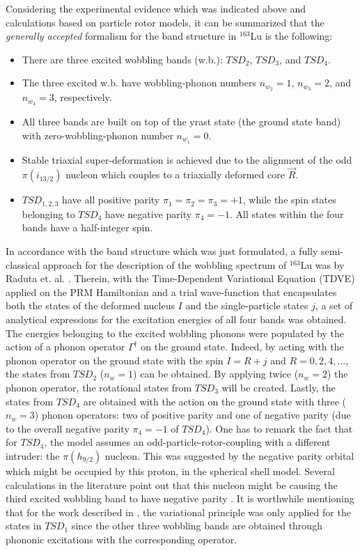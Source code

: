 \documentclass[11pt]{article}
\begin{document}
Considering the experimental evidence which was indicated above and calculations based on particle rotor models, it can be summarized that the \emph{generally accepted} formalism for the band structure in $^{163}$Lu is the following:
\begin{itemize}
    \item There are three excited wobbling bands (w.b.): $TSD_2$, $TSD_3$, and $TSD_4$.
    \item The three excited w.b. have wobbling-phonon numbers $n_{w_2}=1$, $n_{w_3}=2$, and $n_{w_4}=3$, respectively.
    \item All three bands are built on top of the yrast state (the ground state band) with zero-wobbling-phonon number $n_{w_1}=0$.
    \item Stable triaxial super-deformation is achieved due to the alignment of the odd $\pi(i_{13/2})$ nucleon which couples to a triaxially deformed core $\vec{R}$.
    \item $TSD_{1,2,3}$ have all positive parity $\pi_1=\pi_2=\pi_3=+1$, while the spin states belonging to $TSD_4$ have negative parity $\pi_4=-1$. All states within the four bands have a half-integer spin.
 \end{itemize}

 In accordance with the band structure which was just formulated, a fully semi-classical approach for the description of the wobbling spectrum of $^{163}$Lu was by Raduta et. al. \cite{raduta2017semiclassical}. Therein, with the Time-Dependent Variational Equation (TDVE) applied on the PRM Hamiltonian and a trial wave-function that encapsulates both the states of the deformed nucleus $I$ and the single-particle states $j$, a set of analytical expressions for the excitation energies of all four bands was obtained. The energies belonging to the excited wobbling phonons were populated by the action of a phonon operator $\Gamma^\dagger$ on the ground state. Indeed, by acting with the phonon operator on the ground state with the spin $I=R+j$ and $R=0,2,4,\dots$, the states from $TSD_2$ ($n_w=1$) can be obtained. By applying twice ($n_w=2$) the phonon operator, the rotational states from $TSD_3$ will be created. Lastly, the states from $TSD_4$ are obtained with the action on the ground state with three ($n_w=3$) phonon operators: two of positive parity and one of negative parity (due to the overall negative parity $\pi_4=-1$ of $TSD_4$). One has to remark the fact that for $TSD_4$, the model assumes an odd-particle-rotor-coupling with a different intruder: the $\pi(h_{9/2})$ nucleon. This was suggested by the negative parity orbital which might be occupied by this proton, in the spherical shell model. Several calculations in the literature point out that this nucleon might be causing the third excited wobbling band to have negative parity \cite{jensen2004coexisting}. It is worthwhile mentioning that for the work described in \cite{raduta2017semiclassical}, the variational principle was only applied for the states in $TSD_1$ since the other three wobbling bands are obtained through phononic excitations with the corresponding operator.
\end{document}
